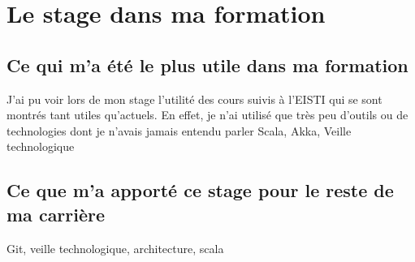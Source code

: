 
\chapter{Le stage dans ma formation} %

\label{formation} %



\section{Ce qui m'a été le plus utile dans ma formation}
J'ai pu voir lors de mon stage l'utilité des cours suivis à l'EISTI qui se sont montrés tant utiles qu'actuels.
En effet, je n'ai utilisé que très peu d'outils ou de technologies dont je n'avais jamais entendu parler
Scala, Akka, Veille technologique


\section{Ce que m'a apporté ce stage pour le reste de ma carrière}
Git, veille technologique, architecture, scala

